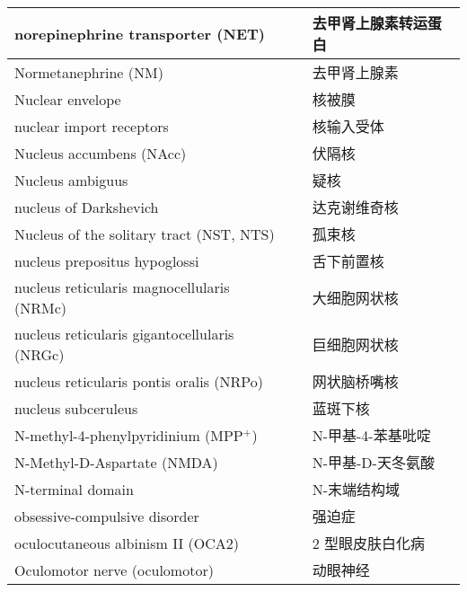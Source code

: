 \begin{longtable}{lll}
	\midrule
	norepinephrine transporter (NET)   && 去甲肾上腺素转运蛋白 \\
	
	\midrule
	Normetanephrine (NM)  && 去甲肾上腺素 \\
	
	\midrule
	Nuclear envelope   && 核被膜  \\
	
	\midrule
	nuclear import receptors   && 核输入受体  \\
	
	\midrule
	Nucleus accumbens (NAcc)  && 伏隔核  \\
	
	\midrule
	Nucleus ambiguus   && 疑核  \\
	
	\midrule
	nucleus of Darkshevich   && 达克谢维奇核  \\
	
	\midrule
	Nucleus of the solitary tract (NST, NTS)  && 孤束核  \\
	
	\midrule
	nucleus prepositus hypoglossi   && 舌下前置核  \\
	
	\midrule
	nucleus reticularis magnocellularis (NRMc)   && 大细胞网状核  \\
	
	\midrule
	nucleus reticularis gigantocellularis (NRGc)   && 巨细胞网状核  \\
	
	\midrule
	nucleus reticularis pontis oralis (NRPo)   && 网状脑桥嘴核  \\
	
	\midrule
	nucleus subceruleus   && 蓝斑下核  \\
	
	\midrule
	N-methyl-4-phenylpyridinium (MPP$^+$)  && N-甲基-4-苯基吡啶  \\
	
	\midrule
	N-Methyl-D-Aspartate (NMDA)   && N-甲基-D-天冬氨酸  \\
	
	\midrule
	N-terminal domain   && N-末端结构域  \\
	
	\midrule
	obsessive-compulsive disorder     && 强迫症   \\
	
	\midrule
	oculocutaneous albinism II (OCA2)     && 2 型眼皮肤白化病   \\
	
	\midrule
	Oculomotor nerve (oculomotor)     && 动眼神经   \\
	

\end{longtable}
